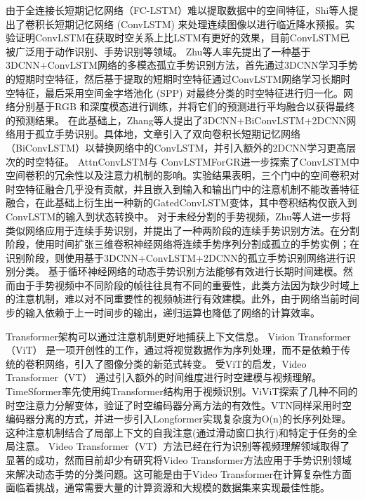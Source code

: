 由于全连接长短期记忆网络（FC-LSTM）难以提取数据中的空间特征，Shi等人\cite{shi2015convlstm}提出了卷积长短期记忆网络 (ConvLSTM) 来处理连续图像以进行临近降水预报。实验证明ConvLSTM在获取时空关系上比LSTM有更好的效果，目前ConvLSTM已被广泛用于动作识别、手势识别等领域。
Zhu等人\cite{zhu2017multimodal}率先提出了一种基于3DCNN+ConvLSTM网络的多模态孤立手势识别方法，首先通过3DCNN学习手势的短期时空特征，然后基于提取的短期时空特征通过ConvLSTM网络学习长期时空特征，最后采用空间金字塔池化 (SPP)\cite{he2015spatial} 对最终分类的时空特征进行归一化。网络分别基于RGB 和深度模态进行训练，并将它们的预测进行平均融合以获得最终的预测结果。
在此基础上，Zhang等人\cite{zhang2017learning}提出了3DCNN+BiConvLSTM+2DCNN网络用于孤立手势识别。具体地，文章引入了双向卷积长短期记忆网络（BiConvLSTM）以替换网络中的ConvLSTM，并引入额外的2DCNN学习更高层次的时空特征。
AttnConvLSTM\cite{zhang2018attention}与
ConvLSTMForGR\cite{zhu2019redundancy}进一步探索了ConvLSTM中空间卷积的冗余性以及注意力机制的影响。实验结果表明，三个门中的空间卷积对时空特征融合几乎没有贡献，并且嵌入到输入和输出门中的注意机制不能改善特征融合，在此基础上衍生出一种新的GatedConvLSTM变体，其中卷积结构仅嵌入到ConvLSTM的输入到状态转换中。
对于未经分割的手势视频，Zhu等人\cite{zhu2018continuous}进一步将类似网络应用于连续手势识别，并提出了一种两阶段的连续手势识别方法。在分割阶段，使用时间扩张三维卷积神经网络将连续手势序列分割成孤立的手势实例；在识别阶段，则使用基于3DCNN+ConvLSTM+2DCNN的孤立手势识别网络进行识别分类。
基于循环神经网络的动态手势识别方法能够有效进行长期时间建模。然而由于手势视频中不同阶段的帧往往具有不同的重要性\cite{lin2018large}，此类方法因为缺少时域上的注意机制，难以对不同重要性的视频帧进行有效建模。此外，由于网络当前时间步的输入依赖于上一时间步的输出，递归运算也降低了网络的计算效率。

Transformer架构\cite{vaswani2017attention}可以通过注意机制更好地捕获上下文信息。
Vision Transformer（ViT） \cite{vit2021image}是一项开创性的工作，通过将视觉数据作为序列处理，而不是依赖于传统的卷积网络，引入了图像分类的新范式转变。
受ViT的启发，Video Transformer（VT）\cite{selva2023video} 通过引入额外的时间维度进行时空建模与视频理解。
TimeSformer\cite{bertasius2021space}率先使用纯Transformer结构用于视频识别。ViViT\cite{arnab2021vivit}探索了几种不同的时空注意力分解变体，验证了时空编码器分离方法的有效性。VTN\cite{neimark2021video}同样采用时空编码器分离的方式，并进一步引入Longformer实现复杂度为O(n)的长序列处理。这种注意机制结合了局部上下文的自我注意(通过滑动窗口执行)和特定于任务的全局注意。
Video Transformer（VT）方法已经在行为识别等视频理解领域取得了显著的成功，然而目前却少有研究将Video Transformer方法应用于手势识别领域来解决动态手势的分类问题。这可能是由于Video Transformer在计算复杂性方面面临着挑战，通常需要大量的计算资源和大规模的数据集来实现最佳性能\cite{khan2022transformers}。

